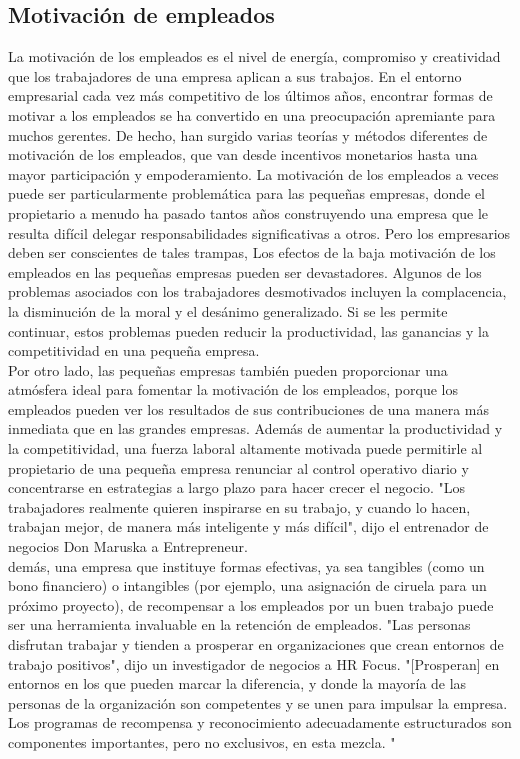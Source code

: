 \documentclass[10pt]{book}
\begin{document}
\subsection{Motivación de empleados}
La motivación de los empleados es el nivel de energía, compromiso y creatividad que los trabajadores de una empresa aplican a sus trabajos. En el entorno empresarial cada vez más competitivo de los últimos años, encontrar formas de motivar a los empleados se ha convertido en una preocupación apremiante para muchos gerentes. De hecho, han surgido varias teorías y métodos diferentes de motivación de los empleados, que van desde incentivos monetarios hasta una mayor participación y empoderamiento. La motivación de los empleados a veces puede ser particularmente problemática para las pequeñas empresas, donde el propietario a menudo ha pasado tantos años construyendo una empresa que le resulta difícil delegar responsabilidades significativas a otros. Pero los empresarios deben ser conscientes de tales trampas, Los efectos de la baja motivación de los empleados en las pequeñas empresas pueden ser devastadores. Algunos de los problemas asociados con los trabajadores desmotivados incluyen la complacencia, la disminución de la moral y el desánimo generalizado. Si se les permite continuar, estos problemas pueden reducir la productividad, las ganancias y la competitividad en una pequeña empresa.\\
Por otro lado, las pequeñas empresas también pueden proporcionar una atmósfera ideal para fomentar la motivación de los empleados, porque los empleados pueden ver los resultados de sus contribuciones de una manera más inmediata que en las grandes empresas. Además de aumentar la productividad y la competitividad, una fuerza laboral altamente motivada puede permitirle al propietario de una pequeña empresa renunciar al control operativo diario y concentrarse en estrategias a largo plazo para hacer crecer el negocio. "Los trabajadores realmente quieren inspirarse en su trabajo, y cuando lo hacen, trabajan mejor, de manera más inteligente y más difícil", dijo el entrenador de negocios Don Maruska a Entrepreneur.\\
demás, una empresa que instituye formas efectivas, ya sea tangibles (como un bono financiero) o intangibles (por ejemplo, una asignación de ciruela para un próximo proyecto), de recompensar a los empleados por un buen trabajo puede ser una herramienta invaluable en la retención de empleados. "Las personas disfrutan trabajar y tienden a prosperar en organizaciones que crean entornos de trabajo positivos", dijo un investigador de negocios a HR Focus. "[Prosperan] en entornos en los que pueden marcar la diferencia, y donde la mayoría de las personas de la organización son competentes y se unen para impulsar la empresa. Los programas de recompensa y reconocimiento adecuadamente estructurados son componentes importantes, pero no exclusivos, en esta mezcla. "
\end{document}
